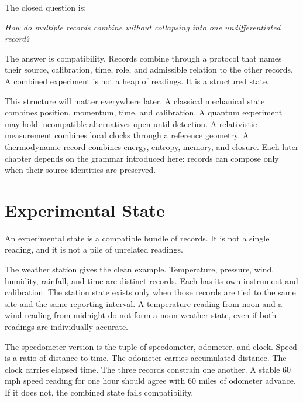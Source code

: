 \begin{chapteressay}
The closed question is:

\begin{center}
\emph{How do multiple records combine without collapsing into one
undifferentiated record?}
\end{center}

The answer is compatibility. Records combine through a protocol that names
their source, calibration, time, role, and admissible relation to the other
records. A combined experiment is not a heap of readings. It is a structured
state.

This structure will matter everywhere later. A classical mechanical state
combines position, momentum, time, and calibration. A quantum experiment may
hold incompatible alternatives open until detection. A relativistic measurement
combines local clocks through a reference geometry. A thermodynamic record
combines energy, entropy, memory, and closure. Each later chapter depends on
the grammar introduced here: records can compose only when their source
identities are preserved.

\end{chapteressay}


\section{Experimental State}
\label{se:experimental-state}

An experimental state is a compatible bundle of records. It is not a single
reading, and it is not a pile of unrelated readings.

The weather station gives the clean example. Temperature, pressure, wind,
humidity, rainfall, and time are distinct records. Each has its own instrument
and calibration. The station state exists only when those records are tied to
the same site and the same reporting interval. A temperature reading from noon
and a wind reading from midnight do not form a noon weather state, even if both
readings are individually accurate.

The speedometer version is the tuple of speedometer, odometer, and clock. Speed
is a ratio of distance to time. The odometer carries accumulated distance. The
clock carries elapsed time. The three records constrain one another. A stable
60 mph speed reading for one hour should agree with 60 miles of odometer
advance. If it does not, the combined state fails compatibility.

